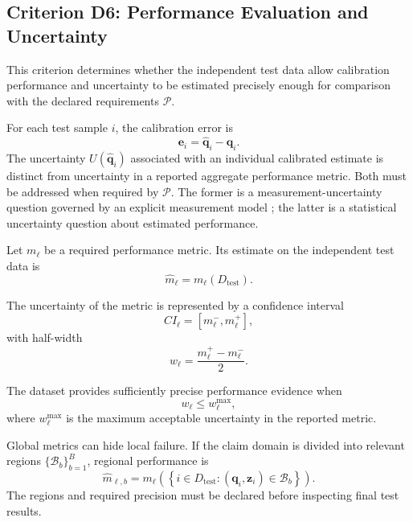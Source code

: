 \documentclass[11pt,a4paper]{article}
\begin{document}
\subsection{Criterion D6: Performance Evaluation and Uncertainty}

This criterion determines whether the independent test data allow calibration
performance and uncertainty to be estimated precisely enough for comparison
with the declared requirements $\mathcal{P}$.

For each test sample $i$, the calibration error is
\begin{equation}
    \mathbf{e}_i
    =
    \widehat{\mathbf{q}}_i-\mathbf{q}_i.
\end{equation}
The uncertainty $U(\widehat{\mathbf{q}}_i)$ associated with an individual
calibrated estimate is distinct from uncertainty in a reported aggregate
performance metric. Both must be addressed when required by $\mathcal{P}$.
The former is a measurement-uncertainty question governed by an explicit
measurement model \cite{jcgm100}; the latter is a statistical uncertainty
question about estimated performance.

Let $m_\ell$ be a required performance metric. Its estimate on the independent
test data is
\begin{equation}
    \widehat{m}_\ell
    =
    m_\ell(D_{\mathrm{test}}).
\end{equation}

The uncertainty of the metric is represented by a confidence interval
\begin{equation}
    CI_\ell
    =
    \left[
        m_\ell^{-},
        m_\ell^{+}
    \right],
\end{equation}
with half-width
\begin{equation}
    w_\ell
    =
    \frac{
        m_\ell^{+}-m_\ell^{-}
    }{2}.
\end{equation}

The dataset provides sufficiently precise performance evidence when
\begin{equation}
    w_\ell
    \leq
    w_\ell^{\max},
\end{equation}
where $w_\ell^{\max}$ is the maximum acceptable uncertainty in the reported
metric.

Global metrics can hide local failure. If the claim domain is divided into
relevant regions $\{\mathcal{B}_b\}_{b=1}^{B}$, regional performance is
\begin{equation}
    \widehat{m}_{\ell,b}
    =
    m_\ell
    \left(
        \left\{
            i\in D_{\mathrm{test}}
            :
            \left(\mathbf{q}_i,\mathbf{z}_i\right)
            \in\mathcal{B}_b
        \right\}
    \right).
\end{equation}
The regions and required precision must be declared before inspecting final
test results.
\end{document}

